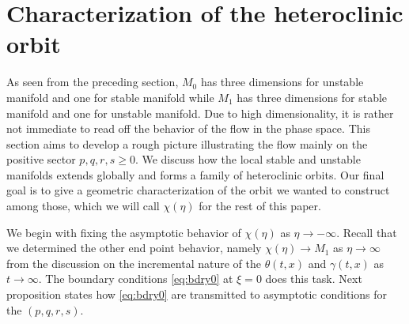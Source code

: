 \documentclass[a4paper,11pt]{article}
\begin{document}
\section{Characterization of the heteroclinic orbit} \label{sec:char}
As seen from the preceding section, $M_0$ has three dimensions for unstable manifold and one for stable manifold while $M_1$ has three dimensions for stable manifold and one for unstable manifold. Due to high dimensionality, it is rather not immediate to read off the behavior of the flow in the phase space. This section aims to develop a rough picture illustrating the flow mainly on the positive sector $p,q,r,s \ge0$. We discuss how the local stable and unstable manifolds extends globally and forms a family of heteroclinic orbits. Our final goal is to give a geometric characterization of the orbit we wanted to construct among those, which we will call $\chi(\eta)$ for the rest of this paper.

We begin with fixing the asymptotic behavior of $\chi(\eta)$ as $\eta \rightarrow -\infty$. Recall that we determined the other end point behavior, namely $\chi(\eta) \rightarrow M_1$ as $\eta \rightarrow \infty$ from the discussion on the incremental nature of the $\theta(t,x)$ and $\gamma(t,x)$ as $t \rightarrow \infty$.  The boundary conditions \eqref{eq:bdry0} at $\xi=0$ does this task. Next proposition states how \eqref{eq:bdry0} are transmitted to asymptotic conditions for the $(p,q,r,s)$.
\end{document}
